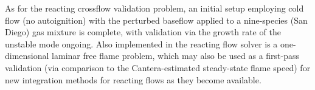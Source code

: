 As for the reacting crossflow validation problem, an initial setup employing
cold flow (no autoignition) with the perturbed baseflow applied to a nine-species
(San Diego) gas mixture is complete, with validation via the growth rate of the
unstable mode ongoing. Also implemented in the reacting flow solver is a one-dimensional
laminar free flame problem, which may also be used as a first-pass validation (via comparison
to the Cantera-estimated steady-state flame speed) for new integration methods for reacting
flows as they become available.

